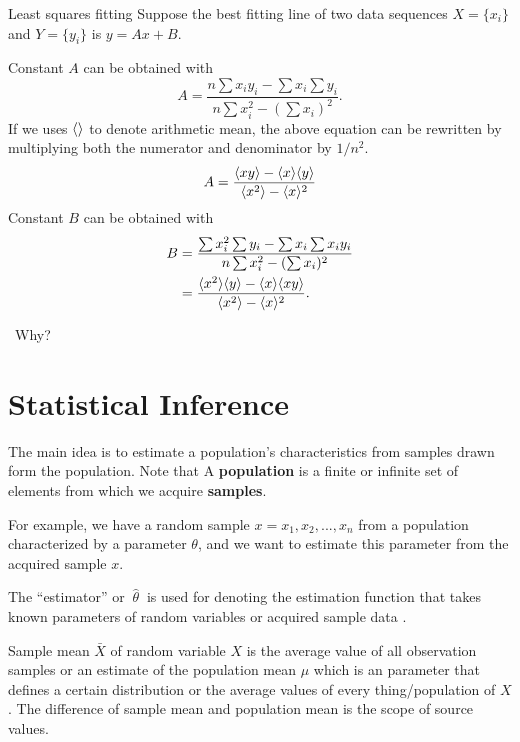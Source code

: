 \documentclass[11pt,a4paper,fleqn]{article}
\numberwithin{equation}{section}
\newcommand{\TODO}{\textcolor{ErrorRed}{\fbox{TODO}}\ }
\DeclarePairedDelimiter\arithMean{\langle}{\rangle}
\begin{document}
\begin{fact}{Least squares fitting}{}
    Suppose the best fitting line of two data sequences $X = \{x_i\}$ and $Y = \{y_i\}$ is $y=Ax+B$.

    Constant $A$ can be obtained with
    \begin{equation*}
        A = \frac{n\sum x_i y_i - \sum x_i \sum y_i}{n \sum x_i^2 - (\sum x_i)^2}.
    \end{equation*}
    If we uses $\arithMean{}$ to denote arithmetic mean, the above equation can be rewritten by multiplying both the numerator and denominator by $1/n^2$.
    \begin{equation*}
        A = \frac{\arithMean{xy} -\arithMean{x}\arithMean{y}}{\arithMean{x^2}-\arithMean{x}^2}
    \end{equation*}
    Constant $B$ can be obtained with
    \begin{align*}
        B
        &= \frac{\sum x_i^2 \sum y_i - \sum x_i \sum x_i y_i}{n\sum x_i^2 - (\sum x_i)^2} \\
        &= \frac{\arithMean{x^2}\arithMean{y}-\arithMean{x}\arithMean{xy}}{\arithMean{x^2}-\arithMean{x}^2}.
    \end{align*}

\end{fact}

\TODO Why?

\section{Statistical Inference}

The main idea is to estimate a population's characteristics from samples drawn form the population. Note that A \textbf{population} is a finite or infinite set of elements from which we acquire \textbf{samples}.

For example, we have a random sample $x={x_1,x_2,...,x_n}$ from a population characterized by a parameter $\theta$, and we want to estimate this parameter from the acquired sample $x$.

The ``estimator'' or $\ \hat{\theta}\ $ is used for denoting the estimation function that takes known parameters of random variables or acquired sample data .

Sample mean $\bar{X}$ of random variable $X$ is the average value of all observation samples or an estimate of the population mean $\mu$ which is an parameter that defines a certain distribution or the average values of every thing/population of $X$.
The difference of sample mean and population mean is the scope of source values.
\end{document}
